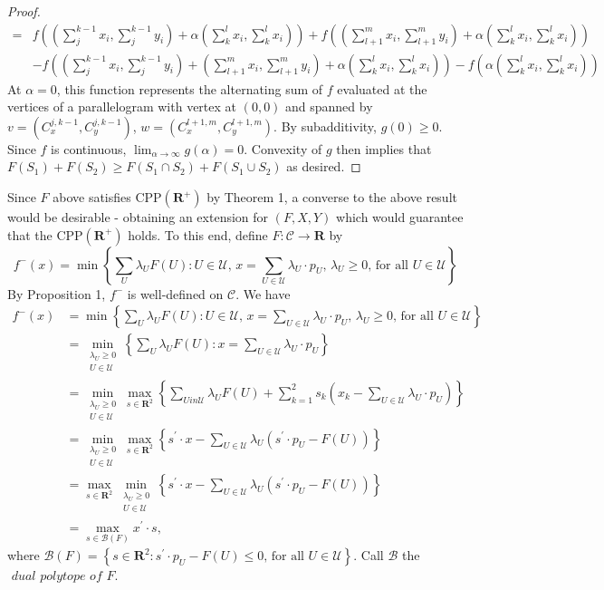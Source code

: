 \documentclass{article}
\theoremstyle{case}
\begin{document}
\begin{proof}
\begin{align*}
= &f((\sum_j^{k-1}x_i, \sum_j^{k-1}y_i) + \alpha(\sum_k^lx_i, \sum_k^lx_i)) + f((\sum_{l+1}^m x_i, \sum_{l+1}^m y_i) + \alpha(\sum_k^lx_i, \sum_k^lx_i)) \\
&- f((\sum_j^{k-1}x_i, \sum_j^{k-1}y_i) + (\sum_{l+1}^m x_i, \sum_{l+1}^m y_i) + \alpha(\sum_k^lx_i, \sum_k^lx_i)) - f(\alpha(\sum_k^lx_i, \sum_k^lx_i))
\end{align*}
At $\alpha = 0$, this function represents the alternating sum of $f$ evaluated at the vertices of a parallelogram with vertex at $(0,0)$ and spanned by $v = (C_x^{j,k-1},C_y^{j,k-1})$, $w = (C_x^{l+1,m},C_y^{l+1,m})$. By subadditivity, $g(0) \geq 0$. Since $f$ is continuous, $\lim_{\alpha \rightarrow \infty}g(\alpha) = 0$. Convexity of $g$ then implies that $F(S_1) + F(S_2) \geq F(S_1 \cap S_2) + F(S_1 \cup S_2)$ as desired.
\end{proof}

Since $F$ above satisfies CPP$(\mathbf{R}^+)$ by Theorem 1, a converse to the above result would be desirable - obtaining an extension for $(F,X,Y)$ which would guarantee that the CPP$(\mathbf{R}^+)$ holds. To this end, define $F:\mathcal{C} \to \mathbf{R}$ by
\[
f^-(x) = \min{\left\lbrace \sum_{U}\lambda_U F(U) \colon U \in \mathcal{U} \text{, } x = \sum_{U \in \mathcal{U}}\lambda_U \cdot p_U \text{, } \lambda_U \geq 0 \text{, for all } U \in \mathcal{U}\right\rbrace}
\]
By Proposition 1, $f^-$ is well-defined on $\mathcal{C}$. We have
\begin{align*}
f^-(x) &= \min{\left\lbrace \sum_{U}\lambda_U F(U) \colon U \in \mathcal{U} \text{, } x = \sum_{U \in \mathcal{U}} \lambda_U \cdot p_U \text{, } \lambda_U \geq 0 \text{, for all } U \in \mathcal{U}\right\rbrace}\\
&= \min_{\substack{\lambda_U \geq 0 \\ U \in \mathcal{U}}}{\left\lbrace \sum_{U}\lambda_U F(U) \colon  x = \sum_{U \in \mathcal{U}} \lambda_U \cdot p_U\right\rbrace} \\
&= \min_{\substack{\lambda_U \geq 0 \\ U \in \mathcal{U}}}\max_{s \in \mathbf{R}^2}{\left\lbrace \sum_{U in \mathcal{U}}\lambda_U F(U)  + \sum_{k=1}^2 s_k\left( x_k - \sum_{U \in \mathcal{U}} \lambda_U \cdot p_U\right)\right\rbrace} \\
&= \min_{\substack{\lambda_U \geq 0 \\ U \in \mathcal{U}}}\max_{s \in \mathbf{R}^2}{\left\lbrace s^{\prime} \cdot x - \sum_{U \in \mathcal{U}}\lambda_U\left( s^{\prime} \cdot p_U - F(U)\right)\right\rbrace} \\
&= \max_{s \in \mathbf{R}^2}\min_{\substack{\lambda_U \geq 0 \\ U \in \mathcal{U}}}{\left\lbrace s^{\prime} \cdot x - \sum_{U \in \mathcal{U}}\lambda_U\left( s^{\prime} \cdot p_U - F(U)\right)\right\rbrace} \\
&= \max_{s \in \mathcal{B}(F)}{x^{\prime} \cdot s},
\end{align*}
where $\mathcal{B}(F) = \left\lbrace s \in \mathbf{R}^2 \colon s^{\prime} \cdot p_U - F(U) \leq 0 \text{, for all } U \in \mathcal{U}\right\rbrace$. Call $\mathcal{B}$ the $\textit{ dual polytope of }F$. 
\end{document}
